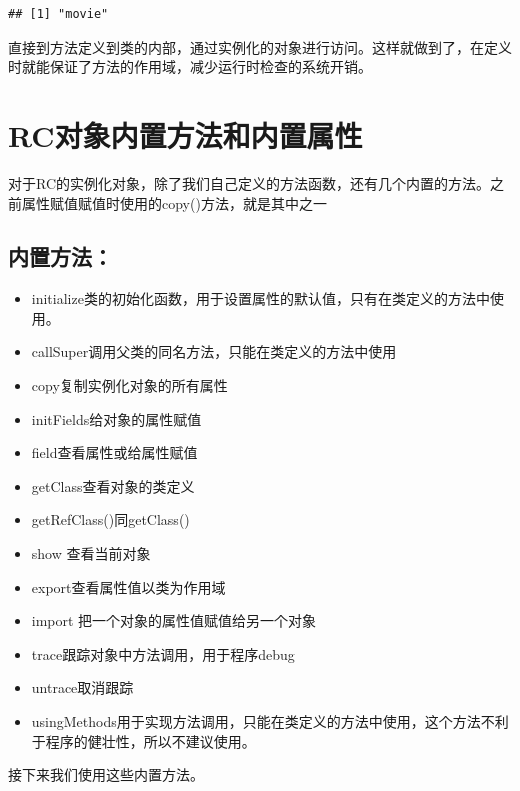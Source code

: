 \documentclass[]{book}
\begin{document}
\begin{verbatim}
## [1] "movie"
\end{verbatim}

直接到方法定义到类的内部，通过实例化的对象进行访问。这样就做到了，在定义时就能保证了方法的作用域，减少运行时检查的系统开销。

\section{RC对象内置方法和内置属性}\label{rc}

对于RC的实例化对象，除了我们自己定义的方法函数，还有几个内置的方法。之前属性赋值赋值时使用的copy()方法，就是其中之一

\subsection{内置方法：}

\begin{itemize}
\item
  initialize类的初始化函数，用于设置属性的默认值，只有在类定义的方法中使用。
\item
  callSuper调用父类的同名方法，只能在类定义的方法中使用
\item
  copy复制实例化对象的所有属性
\item
  initFields给对象的属性赋值
\item
  field查看属性或给属性赋值
\item
  getClass查看对象的类定义
\item
  getRefClass()同getClass()
\item
  show 查看当前对象
\item
  export查看属性值以类为作用域
\item
  import 把一个对象的属性值赋值给另一个对象
\item
  trace跟踪对象中方法调用，用于程序debug
\item
  untrace取消跟踪
\item
  usingMethods用于实现方法调用，只能在类定义的方法中使用，这个方法不利于程序的健壮性，所以不建议使用。
\end{itemize}

接下来我们使用这些内置方法。
\end{document}
